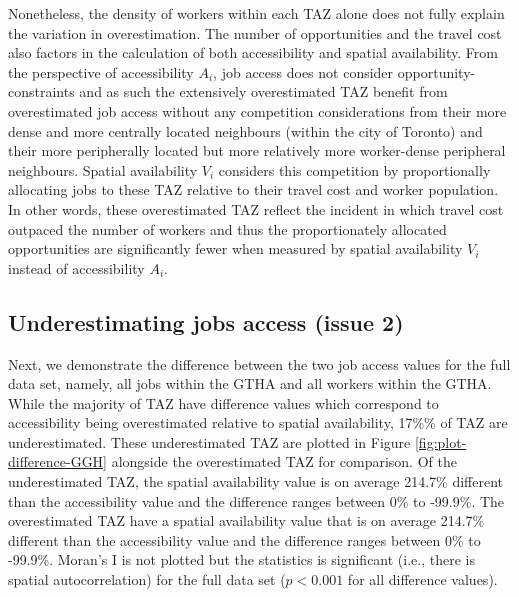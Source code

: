 \documentclass[]{elsarticle} %
\begin{document}
Nonetheless, the density of workers within each TAZ alone does not fully
explain the variation in overestimation. The number of opportunities and
the travel cost also factors in the calculation of both accessibility
and spatial availability. From the perspective of accessibility \(A_i\),
job access does not consider opportunity-constraints and as such the
extensively overestimated TAZ benefit from overestimated job access
without any competition considerations from their more dense and more
centrally located neighbours (within the city of Toronto) and their more
peripherally located but more relatively more worker-dense peripheral
neighbours. Spatial availability \(V_i\) considers this competition by
proportionally allocating jobs to these TAZ relative to their travel
cost and worker population. In other words, these overestimated TAZ
reflect the incident in which travel cost outpaced the number of workers
and thus the proportionately allocated opportunities are significantly
fewer when measured by spatial availability \(V_i\) instead of
accessibility \(A_i\).

\hypertarget{underestimating-jobs-access-issue-2}{%
\subsection{Underestimating jobs access (issue
2)}\label{underestimating-jobs-access-issue-2}}

Next, we demonstrate the difference between the two job access values
for the full data set, namely, all jobs within the GTHA and all workers
within the GTHA. While the majority of TAZ have difference values which
correspond to accessibility being overestimated relative to spatial
availability, 17\%\% of TAZ are underestimated. These underestimated TAZ
are plotted in Figure \ref{fig:plot-difference-GGH} alongside the
overestimated TAZ for comparison. Of the underestimated TAZ, the spatial
availability value is on average 214.7\% different than the
accessibility value and the difference ranges between 0\% to -99.9\%.
The overestimated TAZ have a spatial availability value that is on
average 214.7\% different than the accessibility value and the
difference ranges between 0\% to -99.9\%. Moran's I is not plotted but
the statistics is significant (i.e., there is spatial autocorrelation)
for the full data set (\(p< 0.001\) for all difference values).
\end{document}

